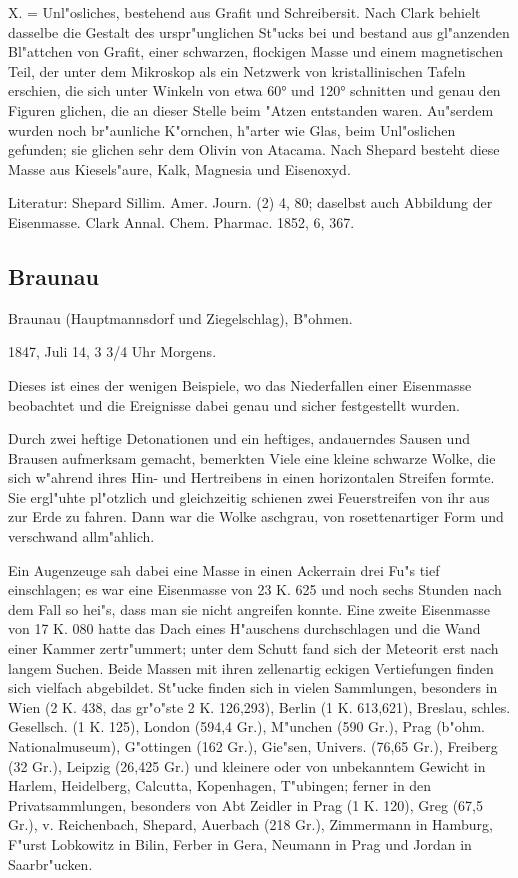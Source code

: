 \documentclass[a4paper, 11pt, oneside]{article}
\begin{document}
X. = Unl"osliches, bestehend aus Grafit und Schreibersit. Nach Clark behielt dasselbe die Gestalt des urspr"unglichen St"ucks bei und bestand aus gl"anzenden Bl"attchen von Grafit, einer schwarzen, flockigen Masse und einem magnetischen Teil, der unter dem Mikroskop als ein Netzwerk von kristallinischen Tafeln erschien, die sich unter Winkeln von etwa 60° und 120° schnitten und genau den Figuren glichen, die an dieser Stelle beim "Atzen entstanden waren. Au"serdem wurden noch br"aunliche K"ornchen, h"arter wie Glas, beim Unl"oslichen gefunden; sie glichen sehr dem Olivin von Atacama. Nach Shepard besteht diese Masse aus Kiesels"aure, Kalk, Magnesia und Eisenoxyd.

Literatur: Shepard Sillim. Amer. Journ. (2) 4, 80; daselbst auch Abbildung der Eisenmasse. Clark Annal. Chem. Pharmac. 1852, 6, 367.

\subsection{Braunau}

Braunau (Hauptmannsdorf und Ziegelschlag), B"ohmen.

1847, Juli 14, 3 3/4 Uhr Morgens.

Dieses ist eines der wenigen Beispiele, wo das Niederfallen einer Eisenmasse beobachtet und die Ereignisse dabei genau und sicher festgestellt wurden.

Durch zwei heftige Detonationen und ein heftiges, andauerndes Sausen und Brausen aufmerksam gemacht, bemerkten Viele eine kleine schwarze Wolke, die sich w"ahrend ihres Hin- und Hertreibens in einen horizontalen Streifen formte. Sie ergl"uhte pl"otzlich und gleichzeitig schienen zwei Feuerstreifen von ihr aus zur Erde zu fahren. Dann war die Wolke aschgrau, von rosettenartiger Form und verschwand allm"ahlich.

Ein Augenzeuge sah dabei eine Masse in einen Ackerrain drei Fu"s tief einschlagen; es war eine Eisenmasse von 23 K. 625 und noch sechs Stunden nach dem Fall so hei"s, dass man sie nicht angreifen konnte. Eine zweite Eisenmasse von 17 K. 080 hatte das Dach eines H"auschens durchschlagen und die Wand einer Kammer zertr"ummert; unter dem Schutt fand sich der Meteorit erst nach langem Suchen. Beide Massen mit ihren zellenartig eckigen Vertiefungen finden sich vielfach abgebildet. St"ucke finden sich in vielen Sammlungen, besonders in Wien (2 K. 438, das gr"o"ste 2 K. 126,293), Berlin (1 K. 613,621), Breslau, schles. Gesellsch. (1 K. 125), London (594,4 Gr.), M"unchen (590 Gr.), Prag (b"ohm. Nationalmuseum), G"ottingen (162 Gr.), Gie"sen, Univers. (76,65 Gr.), Freiberg (32 Gr.), Leipzig (26,425 Gr.) und kleinere oder von unbekanntem Gewicht in Harlem, Heidelberg, Calcutta, Kopenhagen, T"ubingen; ferner in den Privatsammlungen, besonders von Abt Zeidler in Prag (1 K. 120), Greg (67,5 Gr.), v. Reichenbach, Shepard, Auerbach (218 Gr.), Zimmermann in Hamburg, F"urst Lobkowitz in Bilin, Ferber in Gera, Neumann in Prag und Jordan in Saarbr"ucken.
\end{document}
